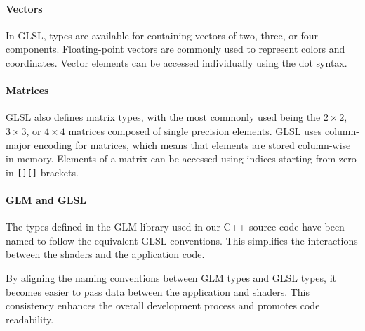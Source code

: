 \paragraph*{Vectors}
In GLSL, types are available for containing vectors of two, three, or four components. 
Floating-point vectors are commonly used to represent colors and coordinates.
Vector elements can be accessed individually using the dot syntax.

\paragraph*{Matrices}
GLSL also defines matrix types, with the most commonly used being the $2\times 2$, $3\times 3$, or $4\times 4$ matrices composed of single precision elements.
GLSL uses column-major encoding for matrices, which means that elements are stored column-wise in memory. 
Elements of a matrix can be accessed using indices starting from zero in \texttt{[][]} brackets. 

\paragraph*{GLM and GLSL}
The types defined in the GLM library used in our C++ source code have been named to follow the equivalent GLSL conventions. 
This simplifies the interactions between the shaders and the application code.

By aligning the naming conventions between GLM types and GLSL types, it becomes easier to pass data between the application and shaders. 
This consistency enhances the overall development process and promotes code readability.

